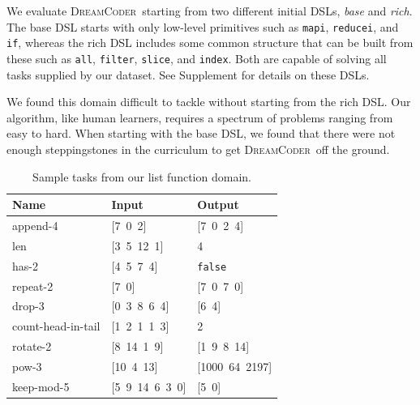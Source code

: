\documentclass{article}
\newcommand{\system}{\textsc{DreamCoder}~}
\newcommand{\code}[1]{{\footnotesize\texttt{#1}}}
\begin{document}
We evaluate \system starting from two different initial DSLs, \emph{base} and
\emph{rich}. The base DSL starts with only
low-level primitives such as \code{mapi}, \code{reducei}, and
\code{if}, whereas the rich DSL includes some common structure that can be
built from these such as \code{all}, \code{filter}, \code{slice}, and
\code{index}.
Both are capable of solving all tasks supplied by our dataset.
See Supplement for details on these DSLs.

We found  this domain  difficult to tackle without starting from 
the rich DSL. Our
algorithm, like human learners, requires a spectrum of problems ranging from
easy to hard.
When starting with the base DSL,
we found that there were not enough steppingstones in the curriculum to
get \system off the ground.


\begin{table}
\centering
\begin{tabular}{lll}
  \toprule
  Name & Input & Output \\\midrule
  append-4 & [7\, 0\, 2] & [7\, 0\, 2\, 4] \\
  len & [3\, 5\, 12\, 1] & 4 \\
  has-2 & [4\, 5\, 7\, 4] & \code{false} \\
  repeat-2 & [7\, 0] & [7\, 0\, 7\, 0] \\
  drop-3 & [0\, 3\, 8\, 6\, 4] & [6\, 4] \\
  count-head-in-tail & [1\, 2\, 1\, 1\, 3] & 2 \\
  rotate-2 & [8\, 14\, 1\, 9] & [1\, 9\, 8\, 14] \\
  pow-3 & [10\, 4\, 13] & [1000\, 64\, 2197] \\
  keep-mod-5 & [5\, 9\, 14\, 6\, 3\, 0] & [5\, 0] \\
  \bottomrule
\end{tabular}
\caption{Sample tasks from our list function domain. %
}
\label{listexamples}
\end{table}
\end{document}
